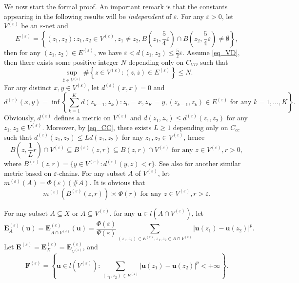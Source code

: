 \documentclass[11pt,a4paper]{article}
\numberwithin{equation}{section}
\theoremstyle{plain}
\theoremstyle{definition}
\begin{document}
We now start the formal proof. An important remark is that the constants appearing in the following results will be \emph{independent} of $\varepsilon$. For any $\varepsilon>0$, let $V^{(\varepsilon)}$ be an $\varepsilon$-net and
$$E^{(\varepsilon)}=\left\{(z_1,z_2):z_1,z_2\in V^{(\varepsilon)},z_1\ne z_2, B(z_1,\frac{5}{4}\varepsilon)\cap B(z_2,\frac{5}{4}\varepsilon)\ne\emptyset\right\},$$
then for any $(z_1,z_2)\in E^{(\varepsilon)}$, we have $\varepsilon<d(z_1,z_2)\le \frac{5}{2}\varepsilon$. Assume \ref{eq_VD}, then there exists some positive integer $N$ depending only on $C_{VD}$ such that
\begin{equation}\label{eq_bdddeg}
\sup_{\overline{z}\in V^{(\varepsilon)}}\# \left\{z\in V^{(\varepsilon)}:(z,\overline{z})\in E^{(\varepsilon)}\right\}\le N.
\end{equation}
For any distinct $x,y\in V^{{(\varepsilon)}}$, let $d^{(\varepsilon)}(x,x)=0$ and
$$d^{(\varepsilon)}(x,y)=\inf \left\{\sum_{k=1}^Kd(z_{k-1},z_k):z_0=x,z_K=y,(z_{k-1},z_k)\in E^{(\varepsilon)}\text{ for any }k=1,\ldots,K\right\}.$$
Obviously, $d^{(\varepsilon)}$ defines a metric on $V^{{(\varepsilon)}}$ and $d(z_1,z_2)\le d^{(\varepsilon)}(z_1,z_2)$ for any $z_1,z_2\in V^{(\varepsilon)}$. Moreover, by \ref{eq_CC}, there exists $L\ge1$ depending only on $C_{cc}$ such that $d^{(\varepsilon)}(z_1,z_2)\le Ld(z_1,z_2)$ for any $z_1,z_2\in V^{(\varepsilon)}$, hence
\begin{equation}\label{eq_eps_ball}
B(z,\frac{1}{L}r)\cap V^{(\varepsilon)}\subseteq B^{(\varepsilon)}(z,r)\subseteq B(z,r)\cap V^{(\varepsilon)}\text{ for any }z\in V^{(\varepsilon)},r>0,
\end{equation}
where $B^{(\varepsilon)}(z,r)=\{y\in V^{(\varepsilon)}:d^{(\varepsilon)}(y,z)<r\}$. See also \cite[Subsection 6.1]{GT12} for another similar metric based on $\varepsilon$-chains. For any subset $A$ of $V^{(\varepsilon)}$, let $m^{(\varepsilon)}(A)=\Phi(\varepsilon)(\# A)$. It is obvious that
\begin{equation*}%
m^{(\varepsilon)}(B^{(\varepsilon)}(z,r))\asymp \Phi(r)\text{ for any }z\in V^{(\varepsilon)}, r>\varepsilon.
\end{equation*}

For any subset $A\subseteq X$ or $A\subseteq V^{(\varepsilon)}$, for any $\mathbf{u}\in l(A\cap V^{(\varepsilon)})$, let
$$\mathbf{E}_A^{(\varepsilon)}(\mathbf{u})=\mathbf{E}_{A\cap V^{(\varepsilon)}}^{(\varepsilon)}(\mathbf{u})=\frac{\Phi(\varepsilon)}{\Psi(\varepsilon)}\sum_{(z_1,z_2)\in E^{(\varepsilon)},z_1,z_2\in A\cap V^{(\varepsilon)}}|\mathbf{u}(z_1)-\mathbf{u}(z_2)|^p.$$
Let $\mathbf{E}^{(\varepsilon)}=\mathbf{E}^{(\varepsilon)}_{X}=\mathbf{E}^{(\varepsilon)}_{V^{(\varepsilon)}}$, and
$$\mathbf{F}^{(\varepsilon)}=\left\{\mathbf{u}\in l(V^{(\varepsilon)}):\sum_{(z_1,z_2)\in E^{(\varepsilon)}}|\mathbf{u}(z_1)-\mathbf{u}(z_2)|^p<+\infty\right\}.$$
\end{document}
